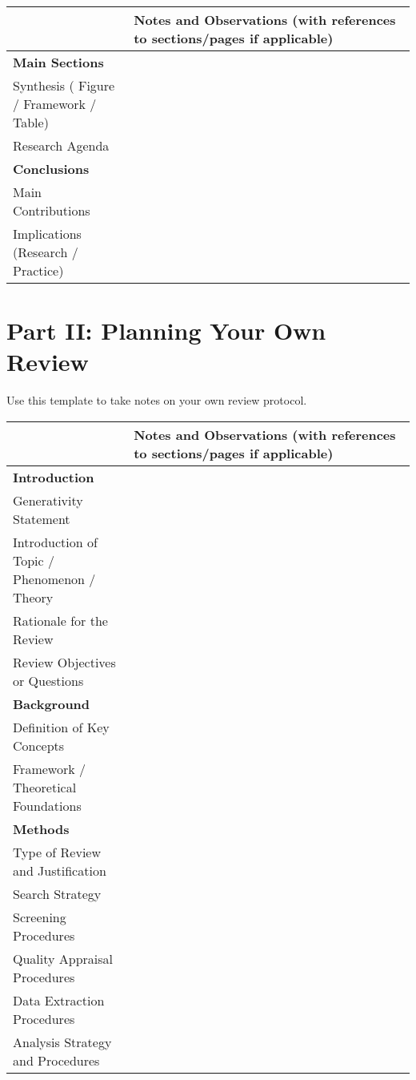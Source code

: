 \documentclass[11pt]{scrartcl}
\theoremstyle{aufgabenstyle}
\begin{document}
{\small
	\begin{longtable}{|p{0.3\linewidth}|p{0.7\linewidth}|}
		\hline
		 & \textbf{Notes and Observations} (with references to sections/pages if applicable) \\
		\hline

		\textbf{Main Sections} & \\
		Synthesis \newline ( Figure / Framework / Table) & \\[14em] \hline
		Research Agenda & \\[14em]
		\hline
		\textbf{Conclusions} & \\
		Main Contributions & \\[10em] \hline
		Implications \newline  (Research / Practice) & \\[10em]
		\hline
	\end{longtable}
}



\newpage

\section*{Part II: Planning Your Own Review}
Use this template to take notes on your own review protocol.

\renewcommand{\arraystretch}{1.9}

{\small
	\begin{longtable}{|p{0.3\linewidth}|p{0.7\linewidth}|}
		\hline
		& \textbf{Notes and Observations} (with references to sections/pages if applicable) \\
		\hline
		\textbf{Introduction} & \\
		Generativity Statement & \\[1.5em]
		Introduction of Topic / \newline  Phenomenon / Theory & \\[1.5em]
		Rationale for the Review & \\[1.5em]
		Review Objectives or Questions & \\[1.5em]
		\hline
		\textbf{Background} & \\
		Definition of Key Concepts & \\[1.5em]
		Framework / Theoretical \newline Foundations & \\[1.5em]
		\hline
		\textbf{Methods} & \\
		Type of Review and Justification & \\[1.5em]
		Search Strategy & \\[1.5em]
		Screening Procedures & \\[1.5em]
		Quality Appraisal Procedures & \\[1.5em]
		Data Extraction Procedures & \\[1.5em]
		Analysis Strategy and Procedures & \\[1.5em]
		\hline
		
	\end{longtable}
}
\end{document}
